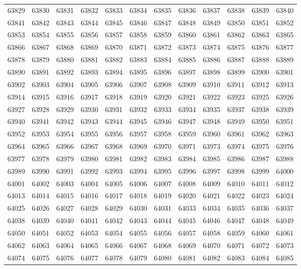 \begin{center}
\begin{longtable}{llllllllllll}
63829 &63830 &63831 &63832 &63833 &63834 &63835 &63836 &63837 &63838 &63839 &63840 \\
63841 &63842 &63843 &63844 &63845 &63846 &63847 &63848 &63849 &63850 &63851 &63852 \\
63853 &63854 &63855 &63856 &63857 &63858 &63859 &63860 &63861 &63862 &63863 &63865 \\
63866 &63867 &63868 &63869 &63870 &63871 &63872 &63873 &63874 &63875 &63876 &63877 \\
63878 &63879 &63880 &63881 &63882 &63883 &63884 &63885 &63886 &63887 &63888 &63889 \\
63890 &63891 &63892 &63893 &63894 &63895 &63896 &63897 &63898 &63899 &63900 &63901 \\
63902 &63903 &63904 &63905 &63906 &63907 &63908 &63909 &63910 &63911 &63912 &63913 \\
63914 &63915 &63916 &63917 &63918 &63919 &63920 &63921 &63922 &63923 &63925 &63926 \\
63927 &63928 &63929 &63930 &63931 &63932 &63933 &63934 &63935 &63937 &63938 &63939 \\
63940 &63941 &63942 &63943 &63944 &63945 &63946 &63947 &63948 &63949 &63950 &63951 \\
63952 &63953 &63954 &63955 &63956 &63957 &63958 &63959 &63960 &63961 &63962 &63963 \\
63964 &63965 &63966 &63967 &63968 &63969 &63970 &63971 &63973 &63974 &63975 &63976 \\
63977 &63978 &63979 &63980 &63981 &63982 &63983 &63984 &63985 &63986 &63987 &63988 \\
63989 &63990 &63991 &63992 &63993 &63994 &63995 &63996 &63997 &63998 &63999 &64000 \\
64001 &64002 &64003 &64004 &64005 &64006 &64007 &64008 &64009 &64010 &64011 &64012 \\
64013 &64014 &64015 &64016 &64017 &64018 &64019 &64020 &64021 &64022 &64023 &64024 \\
64025 &64026 &64027 &64028 &64029 &64030 &64031 &64033 &64034 &64035 &64036 &64037 \\
64038 &64039 &64040 &64041 &64042 &64043 &64044 &64045 &64046 &64047 &64048 &64049 \\
64050 &64051 &64052 &64053 &64054 &64055 &64056 &64057 &64058 &64059 &64060 &64061 \\
64062 &64063 &64064 &64065 &64066 &64067 &64068 &64069 &64070 &64071 &64072 &64073 \\
64074 &64075 &64076 &64077 &64078 &64079 &64080 &64081 &64082 &64083 &64084 &64085 \\

\end{longtable}
\end{center}
